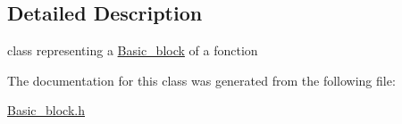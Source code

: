\subsection{\-Detailed \-Description}
class representing a \hyperlink{classBasic__block}{\-Basic\-\_\-block} of a fonction 

\-The documentation for this class was generated from the following file\-:\begin{DoxyCompactItemize}
\item 
\hyperlink{Basic__block_8h}{\-Basic\-\_\-block.\-h}\end{DoxyCompactItemize}
